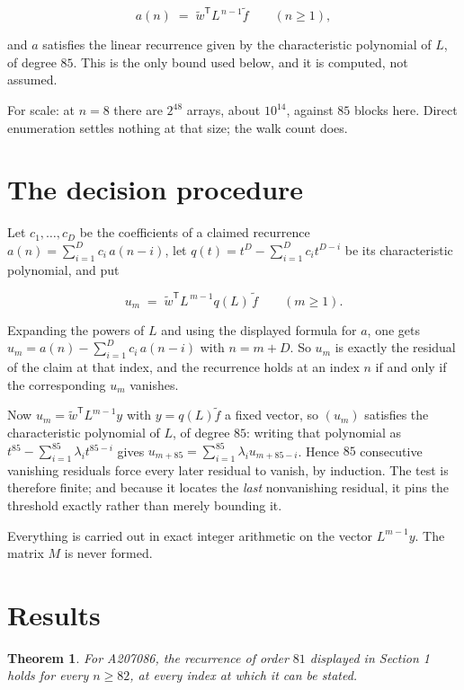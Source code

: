 \documentclass[11pt]{article}
\newtheorem{theorem}{Theorem}
\theoremstyle{definition}
\begin{document}
\[a(n) \;=\; \tilde w^{\mathsf T} L^{\,n-1} \tilde f \qquad (n \ge 1),\]

and $a$ satisfies the linear recurrence given by the characteristic polynomial of $L$, of degree $85$. This is the only bound used below, and it is computed, not assumed.

For scale: at $n = 8$ there are $2^{48}$ arrays, about $10^{14}$, against $85$ blocks here. Direct enumeration settles nothing at that size; the walk count does.

\section{The decision procedure}

Let $c_1,\dots,c_D$ be the coefficients of a claimed recurrence $a(n) = \sum_{i=1}^{D} c_i\,a(n-i)$, let $q(t) = t^{D} - \sum_{i=1}^{D} c_i t^{D-i}$ be its characteristic polynomial, and put

\[u_m \;=\; \tilde w^{\mathsf T} L^{\,m-1} q(L)\,\tilde f \qquad (m \ge 1).\]

Expanding the powers of $L$ and using the displayed formula for $a$, one gets $u_m = a(n) - \sum_{i=1}^{D} c_i\,a(n-i)$ with $n = m + D$. So $u_m$ is exactly the residual of the claim at that index, and the recurrence holds at an index $n$ if and only if the corresponding $u_m$ vanishes.

Now $u_m = \tilde w^{\mathsf T} L^{m-1} y$ with $y = q(L)\tilde f$ a fixed vector, so $(u_m)$ satisfies the characteristic polynomial of $L$, of degree $85$: writing that polynomial as $t^{85} - \sum_{i=1}^{85} \lambda_i t^{85-i}$ gives $u_{m+85} = \sum_{i=1}^{85} \lambda_i u_{m+85-i}$. Hence $85$ consecutive vanishing residuals force every later residual to vanish, by induction. The test is therefore finite; and because it locates the {\itshape last} nonvanishing residual, it pins the threshold exactly rather than merely bounding it.

Everything is carried out in exact integer arithmetic on the vector $L^{m-1}y$. The matrix $M$ is never formed.

\section{Results}

\begin{theorem} For A207086, the recurrence of order $81$ displayed in Section 1 holds for every $n \ge 82$, at every index at which it can be stated.\end{theorem}
\end{document}
